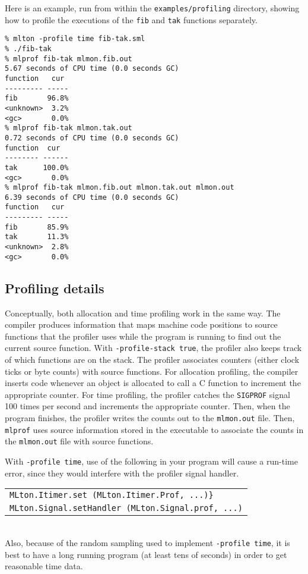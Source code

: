 Here is an example, run from within the {\tt examples/profiling}
directory, showing how to profile the executions of the {\tt fib} and
{\tt tak} functions separately.

\begin{verbatim}
% mlton -profile time fib-tak.sml
% ./fib-tak
% mlprof fib-tak mlmon.fib.out
5.67 seconds of CPU time (0.0 seconds GC)
function   cur 
--------- -----
fib       96.8%
<unknown>  3.2%
<gc>       0.0%
% mlprof fib-tak mlmon.tak.out
0.72 seconds of CPU time (0.0 seconds GC)
function  cur  
-------- ------
tak      100.0%
<gc>       0.0%
% mlprof fib-tak mlmon.fib.out mlmon.tak.out mlmon.out
6.39 seconds of CPU time (0.0 seconds GC)
function   cur 
--------- -----
fib       85.9%
tak       11.3%
<unknown>  2.8%
<gc>       0.0%
\end{verbatim}

\subsection{Profiling details}

Conceptually, both allocation and time profiling work in the same way.
The compiler produces information that maps machine code positions to
source functions that the profiler uses while the program is running
to find out the current source function.  With {\tt -profile-stack
true}, the profiler also keeps track of which functions are on the
stack.  The profiler associates counters (either clock ticks or byte
counts) with source functions.  For allocation profiling, the compiler
inserts code whenever an object is allocated to call a C function to
increment the appropriate counter.  For time profiling, the profiler
catches the {\tt SIGPROF} signal 100 times per second and increments
the appropriate counter.  Then, when the program finishes, the
profiler writes the counts out to the {\tt mlmon.out} file.  Then,
{\tt mlprof} uses source information stored in the executable to
associate the counts in the {\tt mlmon.out} file with source
functions.

With {\tt -profile time}, use of the following in your program will
cause a run-time error, since they would interfere with the profiler
signal handler.\\
\begin{tabular}{l}
\tt MLton.Itimer.set (MLton.Itimer.Prof, ...)\}\\
\tt MLton.Signal.setHandler (MLton.Signal.prof, ...)
\end{tabular}\\
Also, because of the random sampling used to implement {\tt -profile
time}, it is best to have a long running program (at least tens of
seconds) in order to get reasonable time data.

